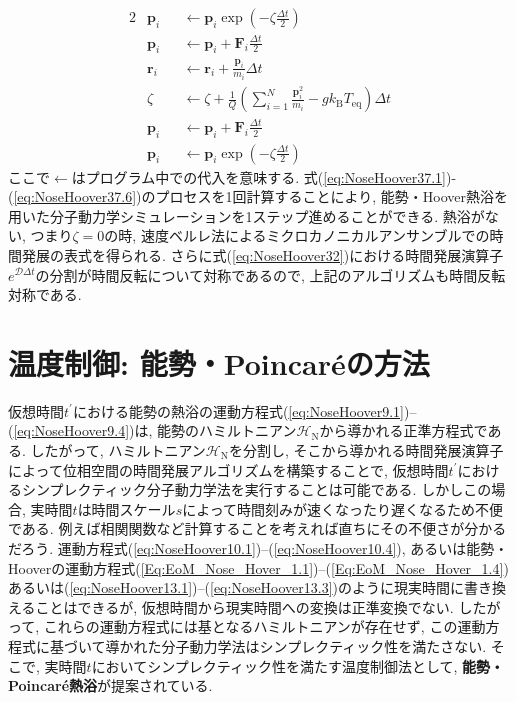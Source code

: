\begin{alignat}{2}
 &\bm{p}_{i} &&\gets \bm{p}_{i} \exp \left(-\zeta \frac{\Delta t}{2}\right)
 \label{eq:NoseHoover37.1}
 \\
 &\bm{p}_{i} &&\gets \bm{p}_{i} + \bm{F}_{i} \frac{\Delta t}{2}
 \label{eq:NoseHoover37.2}
 \\
 &\bm{r}_{i} &&\gets \bm{r}_{i} + \frac{\bm{p}_{i}}{m_{i}} \Delta t
 \label{eq:NoseHoover37.3}
 \\
 &\zeta          &&\gets \zeta
                           + \frac{1}{Q}
                           \left(
                           \sum_{i=1}^{N} \frac{\bm{p}_{i}^{2}}{m_{i}}
                           - g k_{\mathrm{B}} T_{\mathrm{eq}}
                           \right) \Delta t
 \label{eq:NoseHoover37.4}
 \\
 &\bm{p}_{i} &&\gets \bm{p}_{i} + \bm{F}_{i} \frac{\Delta t}{2}
 \label{eq:NoseHoover37.5}
 \\
 &\bm{p}_{i} &&\gets \bm{p}_{i} \exp \left(-\zeta \frac{\Delta t}{2}\right)
 \label{eq:NoseHoover37.6}
\end{alignat}
ここで$\gets$はプログラム中での代入を意味する.
式(\ref{eq:NoseHoover37.1})-(\ref{eq:NoseHoover37.6})のプロセスを1回計算することにより, 能勢・Hoover熱浴を用いた分子動力学シミュレーションを1ステップ進めることができる.
熱浴がない, つまり$\zeta=0$の時, 速度ベルレ法によるミクロカノニカルアンサンブルでの時間発展の表式を得られる.
さらに式(\ref{eq:NoseHoover32})における時間発展演算子$e^{\mathcal{D} \Delta t}$の分割が時間反転について対称であるので, 上記のアルゴリズムも時間反転対称である.

\section{温度制御: 能勢・Poincar\'{e}の方法}
仮想時間$t^{\prime}$における能勢の熱浴の運動方程式(\ref{eq:NoseHoover9.1})--(\ref{eq:NoseHoover9.4})は, 能勢のハミルトニアン$\mathcal{H}_{\mathrm{N}}$から導かれる正準方程式である.
したがって, ハミルトニアン$\mathcal{H}_{\mathrm{N}}$を分割し, そこから導かれる時間発展演算子によって位相空間の時間発展アルゴリズムを構築することで, 仮想時間$t^{\prime}$におけるシンプレクティック分子動力学法を実行することは可能である. しかしこの場合, 実時間$t$は時間スケール$s$によって時間刻みが速くなったり遅くなるため不便である. 例えば相関関数など計算することを考えれば直ちにその不便さが分かるだろう. 運動方程式(\ref{eq:NoseHoover10.1})--(\ref{eq:NoseHoover10.4}), あるいは能勢・Hooverの運動方程式(\ref{Eq:EoM_Nose_Hover_1.1})--(\ref{Eq:EoM_Nose_Hover_1.4})あるいは(\ref{eq:NoseHoover13.1})--(\ref{eq:NoseHoover13.3})のように現実時間に書き換えることはできるが, 仮想時間から現実時間への変換は正準変換でない. したがって, これらの運動方程式には基となるハミルトニアンが存在せず, この運動方程式に基づいて導かれた分子動力学法はシンプレクティック性を満たさない. そこで, 実時間$t$においてシンプレクティック性を満たす温度制御法として, \textbf{能勢・Poincar\'{e}熱浴}が提案されている.

